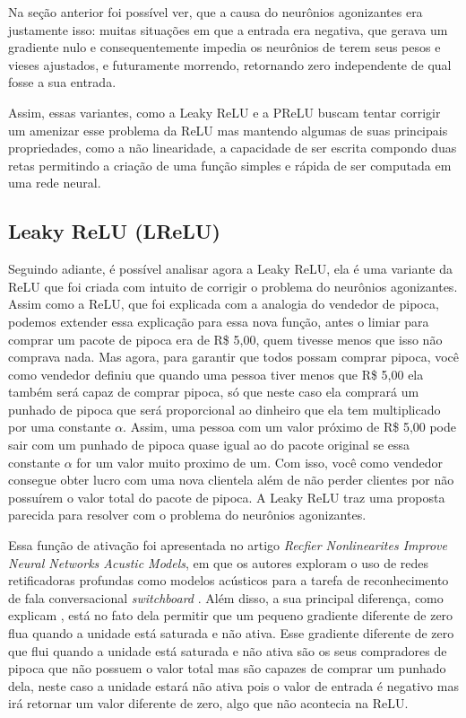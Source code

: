 Na seção anterior foi possível ver, que a causa do neurônios agonizantes era justamente isso: muitas situações em que a entrada era negativa, que gerava um gradiente nulo e consequentemente impedia os neurônios de terem seus pesos e vieses ajustados, e futuramente morrendo, retornando zero independente de qual fosse a sua entrada.

Assim, essas variantes, como a Leaky ReLU e a PReLU buscam tentar corrigir um amenizar esse problema da ReLU mas mantendo algumas de suas principais propriedades, como a não linearidade, a capacidade de ser escrita compondo duas retas permitindo a criação de uma função simples e rápida de ser computada em uma rede neural.

\subsection{Leaky ReLU (LReLU)}

Seguindo adiante, é possível analisar agora a Leaky ReLU, ela é uma variante da ReLU que foi criada com intuito de corrigir o problema do neurônios agonizantes. Assim como a ReLU, que foi explicada com a analogia do vendedor de pipoca, podemos extender essa explicação para essa nova função, antes o limiar para comprar um pacote de pipoca era de R\$ 5,00, quem tivesse menos que isso não comprava nada. Mas agora, para garantir que todos possam comprar pipoca, você como vendedor definiu que quando uma pessoa tiver menos que R\$ 5,00 ela também será capaz de comprar pipoca, só que neste caso ela comprará um punhado de pipoca que será proporcional ao dinheiro que ela tem multiplicado por uma constante $\alpha$. Assim, uma pessoa com um valor próximo de R\$ 5,00 pode sair com um punhado de pipoca quase igual ao do pacote original se essa constante $\alpha$ for um valor muito proximo de um. Com isso, você como vendedor consegue obter lucro com uma nova clientela além de não perder clientes por não possuírem o valor total do pacote de pipoca. A Leaky ReLU traz uma proposta parecida para resolver com o problema do neurônios agonizantes.

Essa função de ativação foi apresentada no artigo \textit{Recfier Nonlinearites Improve Neural Networks Acustic Models}, em que os autores exploram o uso de redes retificadoras profundas como modelos acústicos para a tarefa de reconhecimento de fala conversacional \textit{switchboard} \parencite{LeakyReLUArticle}. Além disso, a sua principal diferença, como explicam \textcite{LeakyReLUArticle}, está no fato dela permitir que um pequeno gradiente diferente de zero flua quando a unidade está saturada e não ativa. Esse gradiente diferente de zero que flui quando a unidade está saturada e não ativa são os seus compradores de pipoca que não possuem o valor total mas são capazes de comprar um punhado dela, neste caso a unidade estará não ativa pois o valor de entrada é negativo mas irá retornar um valor diferente de zero, algo que não acontecia na ReLU.


